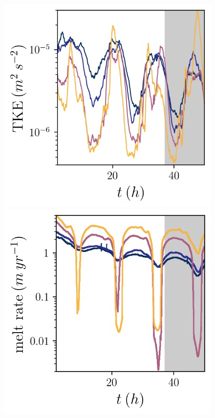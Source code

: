 \documentclass[draft]{styles/agujournal2019}
\begin{document}
\begin{figure}[h!]
    \centering
    \begin{minipage}{0.33\textwidth}
        \includegraphics[trim={0 0 0 0},clip,width=\textwidth]{Figures/tke_cmp_dT_t.png}
    \end{minipage}%
    \begin{minipage}{0.33\textwidth}
        \includegraphics[trim={0 0 0 0},clip,width=\textwidth]{Figures/melt_cmp_dT_t.png}

\end{minipage}
\end{figure}
\end{document}
